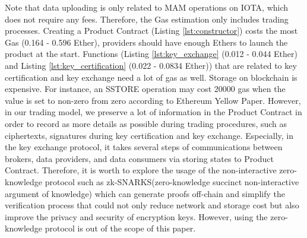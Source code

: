 \documentclass[conference]{IEEEtran}
\begin{document}
\begin{table}[h]
    \caption{Gas consumption for each function of Product Contract}
    \label{tab:gas}
\end{table}

Note that data uploading is only related to MAM operations on IOTA, which does not require any fees. Therefore, the Gas estimation only includes trading processes. Creating a Product Contract (Listing \ref{lst:constructor}) costs the most Gas (0.164 - 0.596 Ether), providers should have enough Ethers to launch the product at the start. Functions (Listing \ref{lst:key_exchange} (0.012 - 0.044 Ether) and Listing \ref{lst:key_certification} (0.022 - 0.0834 Ether)) that are related to key certification and key exchange need a lot of gas as well. Storage on blockchain is expensive. For instance, an SSTORE operation may cost 20000 gas when the value is set to non-zero from zero according to Ethereum Yellow Paper\cite{Ethereum}. However, in our trading model, we preserve a lot of information in the Product Contract in order to record as more details as possible during trading procedures, such as ciphertexts,  signatures during key certification and key exchange. Especially, in the key exchange protocol, it takes several steps of communications between brokers, data providers, and data consumers via storing states to Product Contract. Therefore, it is worth to explore the usage of the non-interactive zero-knowledge protocol such as zk-SNARKS(zero-knowledge succinct non-interactive argument of knowledge)\cite{Snark} which can generate proofs off-chain and simplify the verification process that could not only reduce network and storage cost but also improve the privacy and security of encryption keys. However, using the zero-knowledge protocol is out of the scope of this paper.
\end{document}
